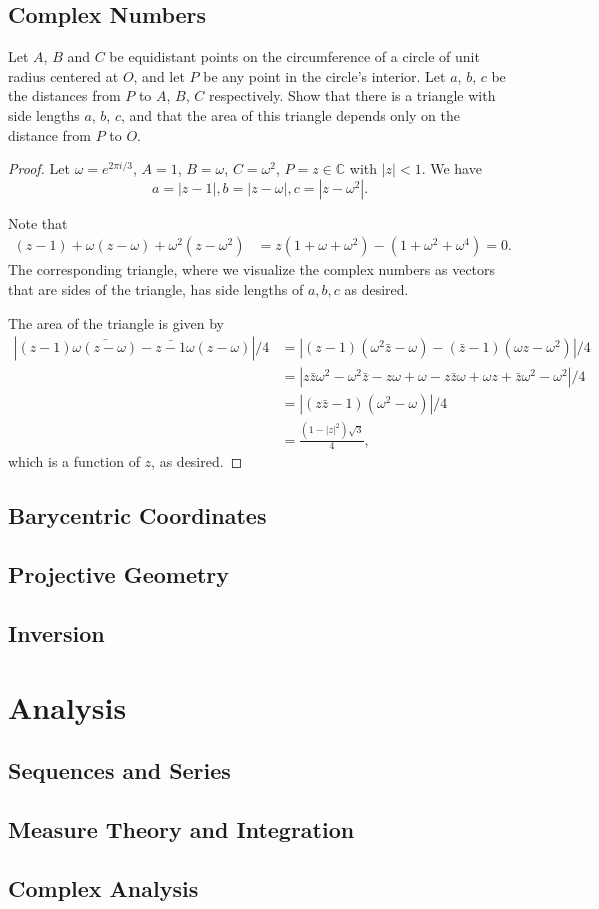 \documentclass[11pt]{article}
\newcommand{\C}{\mathbb C}
\renewcommand{\>}{\rangle}
\newcommand{\<}{\langle}
\begin{document}
\subsection{Complex Numbers}
\begin{problem}[Putnam 2003/B5]Let $A$, $B$ and $C$ be equidistant points on the circumference of a circle of unit radius centered at $O$, and let $P$ be any point in the circle's interior. Let $a$, $b$, $c$ be the distances from $P$ to $A$, $B$, $C$ respectively. Show that there is a triangle with side lengths $a$, $b$, $c$, and that the area of this triangle depends only on the distance from $P$ to $O$.

\begin{proof}
Let $\omega = e^{2\pi i / 3}$, $A = 1$, $B = \omega$, $C = \omega^2$, $P = z \in \C$ with $|z| < 1$.  We have 
$$a = |z - 1|, b = |z - \omega|,  c = |z - \omega^2|.$$

Note that 
\begin{align*}
(z - 1) + \omega(z - \omega) + \omega^2(z - \omega^2) &= z(1 + \omega + \omega^2) - (1 + \omega^2 + \omega^4) = 0.
\end{align*}
The corresponding triangle, where we visualize the complex numbers as vectors that are sides of the triangle, has side lengths of $a, b, c$ as desired.  

The area of the triangle is given by 
\begin{align*}
|(z-1) \bar{\omega(z - \omega)} - \bar{z - 1} \omega(z - \omega)|/4 &= |(z - 1) (\omega^2\bar{z} - \omega) - (\bar{z} - 1) (\omega z - \omega^2)|/4 \\
&= |z \bar{z} \omega^2 - \omega^2 \bar{z} - z\omega + \omega - z\bar{z} \omega + \omega z + \bar{z} \omega^2  - \omega^2|/4 \\
&= |(z \bar{z} - 1) (\omega^2 - \omega)|/4\\
&= \frac{(1 - |z|^2)\sqrt{3}}{4},
\end{align*}
which is a function of $z$, as desired. 
\end{proof}
\end{problem}
\subsection{Barycentric Coordinates}
\subsection{Projective Geometry}
\subsection{Inversion}
\pagebreak
\section{Analysis}
\subsection{Sequences and Series}
\subsection{Measure Theory and Integration}
\subsection{Complex Analysis}
 
\end{document}
